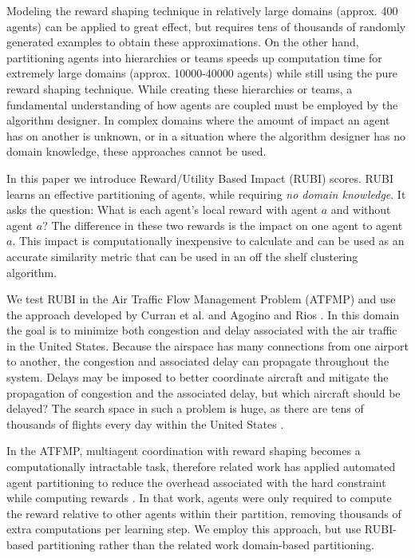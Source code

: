 \documentclass[letterpaper]{article}
\begin{document}
Modeling the reward shaping technique \cite{Proper:2012:MDR:2343896.2344025} in relatively large domains (approx. 400 agents) can be applied to great effect, but requires tens of thousands of randomly generated examples to obtain these approximations. On the other hand, partitioning agents into hierarchies \cite{tumer-holmesparker_ala12} or teams \cite{Curran:2013:AHC:2484920.2485183} speeds up computation time for extremely large domains (approx. 10000-40000 agents) while still using the pure reward shaping technique. While creating these hierarchies or teams, a fundamental understanding of how agents are coupled must be employed by the algorithm designer. In complex domains where the amount of impact an agent has on another is unknown, or in a situation where the algorithm designer has no domain knowledge, these approaches cannot be used. 

In this paper we introduce Reward/Utility Based Impact (RUBI) scores. RUBI learns an effective partitioning of agents, while requiring \textit{no domain knowledge}. It asks the question: What is each agent's local reward with agent $a$ and without agent $a$? The difference in these two rewards is the impact on one agent to agent $a$. This impact is computationally inexpensive to calculate and can be used as an accurate similarity metric that can be used in an off the shelf clustering algorithm. 

We test RUBI in the Air Traffic Flow Management Problem (ATFMP) and use the approach developed by Curran et al. \cite{Curran:2013:AHC:2484920.2485183} and Agogino and Rios \cite{Agogino:2009:EEM:1570256.1570258,Rios}. In this domain the goal is to minimize both congestion and delay associated with the air traffic in the United States. Because the airspace has many connections from one airport to another, the congestion and associated delay can propagate throughout the system. Delays may be imposed to better coordinate aircraft and mitigate the propagation of congestion and the associated delay, but which aircraft should be delayed? The search space in such a problem is huge, as there are tens of thousands of flights every day within the United States \cite{faa05}.

In the ATFMP, multiagent coordination with reward shaping becomes a computationally intractable task, therefore related work has applied automated agent partitioning to reduce the overhead associated with the hard constraint while computing rewards \cite{Agogino:2009:EEM:1570256.1570258,Curran:2013:AHC:2484920.2485183,Rios}. In that work, agents were only required to compute the reward relative to other agents within their partition, removing thousands of extra computations per learning step. We employ this approach, but use RUBI-based partitioning rather than the related work domain-based partitioning.
\end{document}
